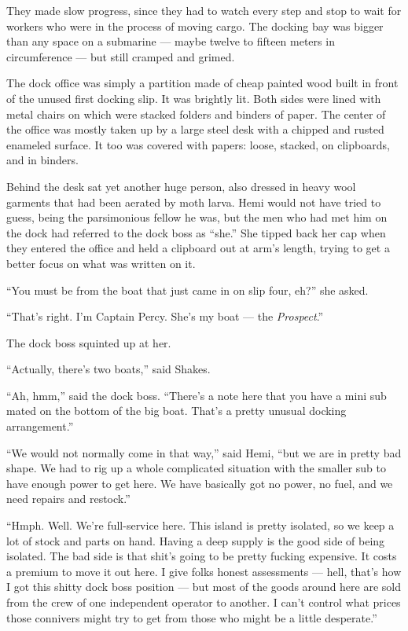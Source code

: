 \documentclass[
]{scrbook}
\begin{document}
They made slow progress, since they had to watch every step and stop to
wait for workers who were in the process of moving cargo. The docking
bay was bigger than any space on a submarine --- maybe twelve to fifteen
meters in circumference --- but still cramped and grimed.

The dock office was simply a partition made of cheap painted wood built
in front of the unused first docking slip. It was brightly lit. Both
sides were lined with metal chairs on which were stacked folders and
binders of paper. The center of the office was mostly taken up by a
large steel desk with a chipped and rusted enameled surface. It too was
covered with papers: loose, stacked, on clipboards, and in binders.

Behind the desk sat yet another huge person, also dressed in heavy wool
garments that had been aerated by moth larva. Hemi would not have tried
to guess, being the parsimonious fellow he was, but the men who had met
him on the dock had referred to the dock boss as ``she.'' She tipped
back her cap when they entered the office and held a clipboard out at
arm's length, trying to get a better focus on what was written on it.

``You must be from the boat that just came in on slip four, eh?'' she
asked.

``That's right. I'm Captain Percy. She's my boat --- the
\emph{Prospect}.''

The dock boss squinted up at her.

``Actually, there's two boats,'' said Shakes.

``Ah, hmm,'' said the dock boss. ``There's a note here that you have a
mini sub mated on the bottom of the big boat. That's a pretty unusual
docking arrangement.''

``We would not normally come in that way,'' said Hemi, ``but we are in
pretty bad shape. We had to rig up a whole complicated situation with
the smaller sub to have enough power to get here. We have basically got
no power, no fuel, and we need repairs and restock.''

``Hmph. Well. We're full-service here. This island is pretty isolated,
so we keep a lot of stock and parts on hand. Having a deep supply is the
good side of being isolated. The bad side is that shit's going to be
pretty fucking expensive. It costs a premium to move it out here. I give
folks honest assessments --- hell, that's how I got this shitty dock
boss position --- but most of the goods around here are sold from the
crew of one independent operator to another. I can't control what prices
those connivers might try to get from those who might be a little
desperate.''
\end{document}
